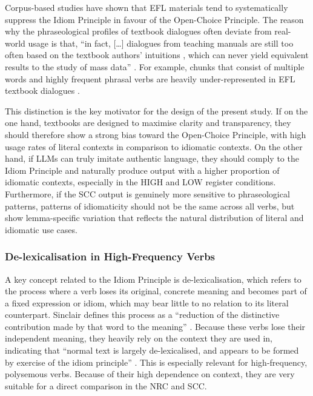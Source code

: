 \documentclass[11pt,a4paper]{article}
\begin{document}
Corpus-based studies have shown that EFL materials tend to systematically suppress the Idiom Principle in favour of the Open-Choice Principle. The reason why the phraseological profiles of textbook dialogues often deviate from real-world usage is that, ``in fact, [\ldots] dialogues from teaching manuals are still too often based on the textbook authors' intuitions \parencite[cf.]{schmale2004kommunikative}, which can never yield equivalent results to the study of mass data'' \parencite[104]{schmaleFormulaicExpressionsForeign2022}. For example, chunks that consist of multiple words and highly frequent phrasal verbs are heavily under-represented in EFL textbook dialogues \parencite[72]{leFoll2024}. 

This distinction is the key motivator for the design of the present study. If on the one hand, textbooks are designed to maximise clarity and transparency, they should therefore show a strong bias toward the Open-Choice Principle, with high usage rates of literal contexts in comparison to idiomatic contexts. On the other hand, if LLMs can truly imitate authentic language, they should comply to the Idiom Principle and naturally produce output with a higher proportion of idiomatic contexts, especially in the HIGH and LOW register conditions. Furthermore, if the SCC output is genuinely more sensitive to phraseological patterns, patterns of idiomaticity should not be the same across all verbs, but show lemma-specific variation that reflects the natural distribution of literal and idiomatic use cases.

\subsubsection{De-lexicalisation in High-Frequency Verbs}\label{subsubsec:delexicalisation}

A key concept related to the Idiom Principle is de-lexicalisation, which refers to the process where a verb loses its original, concrete meaning and becomes part of a fixed expression or idiom, which may bear little to no relation to its literal counterpart. Sinclair defines this process as a ``reduction of the distinctive contribution made by that word to the meaning'' \parencite[113]{sinclairCorpusConcordanceCollocation1991}. Because these verbs lose their independent meaning, they heavily rely on the context they are used in, indicating that ``normal text is largely de-lexicalised, and appears to be formed by exercise of the idiom principle'' \parencite[113]{sinclairCorpusConcordanceCollocation1991}. This is especially relevant for high-frequency, polysemous verbs. Because of their high dependence on context, they are very suitable for a direct comparison in the NRC and SCC.
\end{document}
